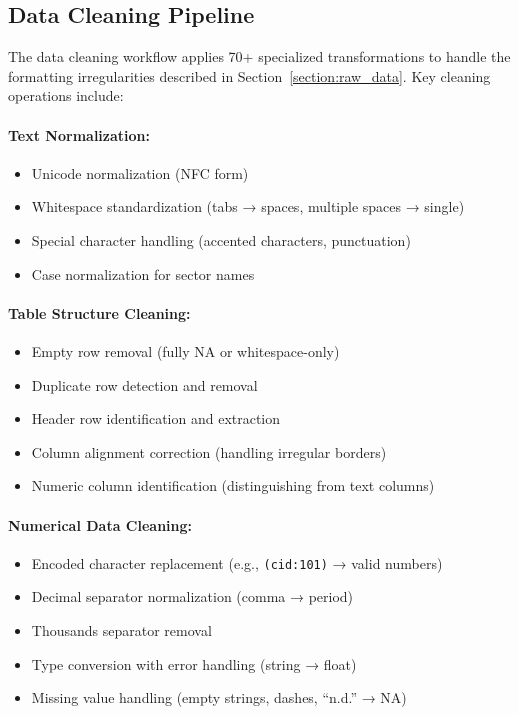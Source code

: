 \documentclass[a4paper, fleqn, 11pt]{article}
\begin{document}
\subsection{Data Cleaning Pipeline}

The data cleaning workflow applies 70+ specialized transformations to handle the formatting irregularities described in Section~\ref{section:raw_data}. Key cleaning operations include:

\paragraph{Text Normalization:}
\begin{itemize}
    \item Unicode normalization (NFC form)
    \item Whitespace standardization (tabs → spaces, multiple spaces → single)
    \item Special character handling (accented characters, punctuation)
    \item Case normalization for sector names
\end{itemize}

\paragraph{Table Structure Cleaning:}
\begin{itemize}
    \item Empty row removal (fully NA or whitespace-only)
    \item Duplicate row detection and removal
    \item Header row identification and extraction
    \item Column alignment correction (handling irregular borders)
    \item Numeric column identification (distinguishing from text columns)
\end{itemize}

\paragraph{Numerical Data Cleaning:}
\begin{itemize}
    \item Encoded character replacement (e.g., \texttt{(cid:101)} → valid numbers)
    \item Decimal separator normalization (comma → period)
    \item Thousands separator removal
    \item Type conversion with error handling (string → float)
    \item Missing value handling (empty strings, dashes, ``n.d.'' → NA)
\end{itemize}
\end{document}
